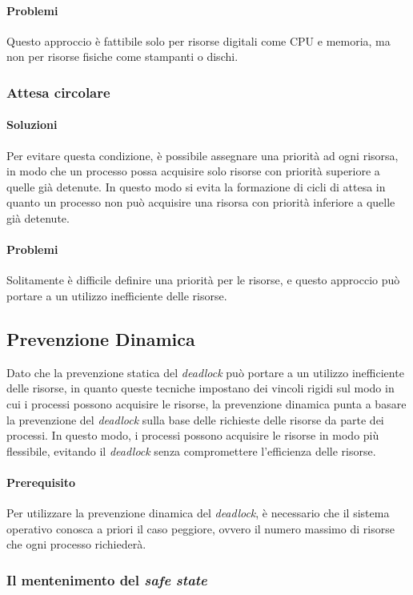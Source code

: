             \paragraph{Problemi} 
                Questo approccio è fattibile solo per risorse digitali come CPU e memoria, ma non per risorse fisiche come stampanti o dischi.
        \subsubsection{Attesa circolare} 
            \paragraph{Soluzioni}
                Per evitare questa condizione, è possibile assegnare una priorità ad ogni risorsa, in modo che un processo possa acquisire solo risorse con priorità superiore a quelle già detenute. In questo modo si evita la formazione di cicli di attesa in quanto un processo non può acquisire una risorsa con priorità inferiore a quelle già detenute.
            \paragraph{Problemi}
                Solitamente è difficile definire una priorità per le risorse, e questo approccio può portare a un utilizzo inefficiente delle risorse.
    \subsection{Prevenzione Dinamica}
        Dato che la prevenzione statica del \textit{deadlock} può portare a un utilizzo inefficiente delle risorse, in quanto queste tecniche impostano dei vincoli rigidi sul modo in cui i processi possono acquisire le risorse, la prevenzione dinamica punta a basare la prevenzione del \textit{deadlock} sulla base delle richieste delle risorse da parte dei processi. In questo modo, i processi possono acquisire le risorse in modo più flessibile, evitando il \textit{deadlock} senza compromettere l'efficienza delle risorse.
        \paragraph{Prerequisito} 
            Per utilizzare la prevenzione dinamica del \textit{deadlock}, è necessario che il sistema operativo conosca a priori il caso peggiore, ovvero il numero massimo di risorse che ogni processo richiederà. 
        \subsubsection{Il mentenimento del \textit{safe state}}
